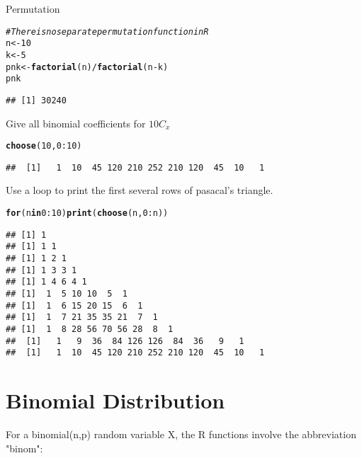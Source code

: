 \documentclass{article}\usepackage[]{graphicx}\usepackage[]{xcolor}
\makeatletter
\newcommand{\hlnum}[1]{\textcolor[rgb]{0.686,0.059,0.569}{#1}}%
\newcommand{\hlcom}[1]{\textcolor[rgb]{0.678,0.584,0.686}{\textit{#1}}}%
\newcommand{\hlopt}[1]{\textcolor[rgb]{0,0,0}{#1}}%
\newcommand{\hldef}[1]{\textcolor[rgb]{0.345,0.345,0.345}{#1}}%
\newcommand{\hlkwa}[1]{\textcolor[rgb]{0.161,0.373,0.58}{\textbf{#1}}}%
\newcommand{\hlkwb}[1]{\textcolor[rgb]{0.69,0.353,0.396}{#1}}%
\newcommand{\hlkwd}[1]{\textcolor[rgb]{0.737,0.353,0.396}{\textbf{#1}}}%
\newenvironment{kframe}{%
 \def\at@end@of@kframe{}%
 \ifinner\ifhmode%
  \def\at@end@of@kframe{\end{minipage}}%
  \begin{minipage}{\columnwidth}%
 \fi\fi%
 \def\FrameCommand##1{\hskip\@totalleftmargin \hskip-\fboxsep
 \colorbox{shadecolor}{##1}\hskip-\fboxsep
     \hskip-\linewidth \hskip-\@totalleftmargin \hskip\columnwidth}%
 \MakeFramed {\advance\hsize-\width
   \@totalleftmargin\z@ \linewidth\hsize
   \@setminipage}}%
 {\par\unskip\endMakeFramed%
 \at@end@of@kframe}
\newenvironment{knitrout}{}{} %
\makeatother
\begin{document}
Permutation
\begin{knitrout}
\color{fgcolor}\begin{kframe}
\begin{alltt}
\hlcom{# There is no separate permutation function in R}
\hldef{n} \hlkwb{<-} \hlnum{10}
\hldef{k} \hlkwb{<-} \hlnum{5}
\hldef{pnk} \hlkwb{<-} \hlkwd{factorial}\hldef{(n)}\hlopt{/}\hlkwd{factorial}\hldef{(n}\hlopt{-}\hldef{k)}
\hldef{pnk}
\end{alltt}
\begin{verbatim}
## [1] 30240
\end{verbatim}
\end{kframe}
\end{knitrout}
Give all binomial coefficients for $10C_x$

\begin{knitrout}
\color{fgcolor}\begin{kframe}
\begin{alltt}
\hlkwd{choose}\hldef{(}\hlnum{10}\hldef{,}\hlnum{0}\hlopt{:}\hlnum{10}\hldef{)}
\end{alltt}
\begin{verbatim}
##  [1]   1  10  45 120 210 252 210 120  45  10   1
\end{verbatim}
\end{kframe}
\end{knitrout}

Use a loop to print the first several rows of pasacal’s triangle.
\begin{knitrout}
\color{fgcolor}\begin{kframe}
\begin{alltt}
\hlkwa{for} \hldef{(n} \hlkwa{in} \hlnum{0}\hlopt{:}\hlnum{10}\hldef{)} \hlkwd{print}\hldef{(}\hlkwd{choose}\hldef{(n,} \hlnum{0}\hlopt{:}\hldef{n))}
\end{alltt}
\begin{verbatim}
## [1] 1
## [1] 1 1
## [1] 1 2 1
## [1] 1 3 3 1
## [1] 1 4 6 4 1
## [1]  1  5 10 10  5  1
## [1]  1  6 15 20 15  6  1
## [1]  1  7 21 35 35 21  7  1
## [1]  1  8 28 56 70 56 28  8  1
##  [1]   1   9  36  84 126 126  84  36   9   1
##  [1]   1  10  45 120 210 252 210 120  45  10   1
\end{verbatim}
\end{kframe}
\end{knitrout}
\section{Binomial Distribution}
For a binomial(n,p) random variable X, the R functions involve the abbreviation "binom":
\end{document}
